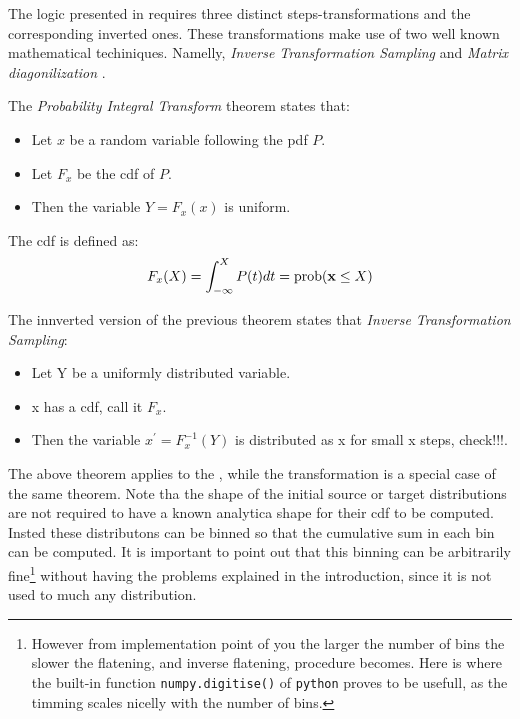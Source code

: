 The logic presented in \figref{} requires three distinct steps-transformations and the corresponding
inverted ones. These transformations make use of two well known mathematical techiniques. Namelly,
{ \it Inverse Transformation Sampling} \cite{} and {\it Matrix diagonilization} \cite{}.

\noindent The {\it Probability Integral Transform} theorem states that:
\begin{center}
\begin{itemize}
\item Let $x$ be a random variable following the pdf $P$.
\item Let $F_x$ be the cdf of $P$.
\item Then the variable $Y=F_x(x)$ is uniform.
\end{itemize}
\end{center}

\noindent The cdf is defined as:
\begin{equation}
F_x(X) = \int_{-\infty}^X P(t)dt  = \text{prob}({\bf x} \leq X) \nonumber
\end{equation}

\noindent The innverted version of the previous theorem states that {\it Inverse Transformation Sampling}:
\begin{center}
\begin{itemize}
\item Let Y be a uniformly distributed variable.
\item x has a cdf, call it $F_x$.
\item Then the variable $x^\prime = F_x^{-1}(Y)$ is distributed as x {\color{red} for small x steps, check!!!}.
\end{itemize}
\end{center}

\noindent The above theorem applies to the , while the transformation  is
a special case of the same theorem. Note tha the shape of the initial source or target distributions are
not required to have a known analytica shape for their cdf to be computed. Insted these distributons can
be binned so that the cumulative sum in each bin can be computed. It is important to point out that this
binning can be arbitrarily fine\footnote{However from implementation point of you the larger the number of
bins the slower the flatening, and inverse flatening, procedure becomes. Here is where the built-in function
{\tt numpy.digitise()} of {\tt python} proves to be usefull, as the timming scales nicelly with the number of bins.}
without having the problems explained in the introduction, since it is not used to much any distribution.

